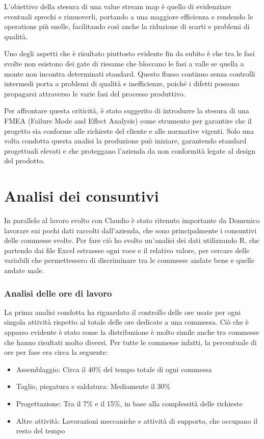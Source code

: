\begin{multicols}{2}
	L’obiettivo della stesura di una value stream map è quello di evidenziare eventuali sprechi e rimuoverli, portando a una maggiore efficienza e rendendo le operations più snelle, facilitando così anche la riduzione di scarti e problemi di qualità.

	Uno degli aspetti che è risultato piuttosto evidente fin da subito è che tra le fasi svolte non esistono dei gate di riesame che bloccano le fasi a valle se quella a monte non incontra determinati standard. Questo flusso continuo senza controlli intermedi porta a problemi di qualità e inefficienze, poiché i difetti possono propagarsi attraverso le varie fasi del processo produttivo.

	Per affrontare questa criticità, è stato suggerito di introdurre la stesura di una FMEA (Failure Mode and Effect Analysis) come strumento per garantire che il progetto sia conforme alle richieste del cliente e alle normative vigenti. Solo una volta condotta questa analisi la produzione può iniziare, garantendo standard progettuali elevati e che proteggano l’azienda da non conformità legate al design del prodotto.


\section{Analisi dei consuntivi}
	In parallelo al lavoro svolto con Claudio è stato ritenuto importante da Domenico lavorare sui pochi dati raccolti dall’azienda, che sono principalmente i consuntivi delle commesse svolte. Per fare ciò ho svolto un’analisi dei dati utilizzando R, che partendo dai file Excel estraesse ogni voce e il relativo valore, per cercare delle variabili che permettessero di discriminare tra le commesse andate bene e quelle andate male.

	\subsubsection{Analisi delle ore di lavoro}
	La prima analisi condotta ha riguardato il controllo delle ore usate per ogni singola attività rispetto al totale delle ore dedicate a una commessa. Ciò che è apparso evidente è stato come la distribuzione è molto simile anche tra commesse che hanno risultati molto diversi. Per tutte le commesse infatti, la percentuale di ore per fase era circa la seguente:
	\begin{itemize}
		\item Assemblaggio: Circa il 40\% del tempo totale di ogni commessa
		\item Taglio, piegatura e saldatura: Mediamente il 30\%
		\item Progettazione: Tra il 7\% e il 15\%, in base alla complessità delle richieste
		\item Altre attività: Lavorazioni meccaniche e attività di supporto, che occupano il resto del tempo
	\end{itemize}


\end{multicols}
